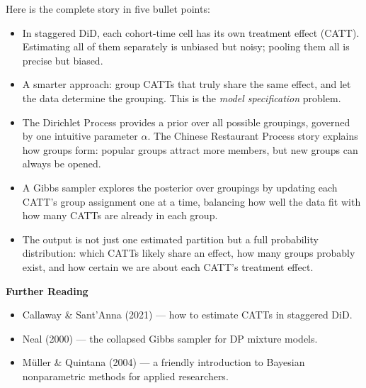 \documentclass[12pt]{article}
\begin{document}
Here is the complete story in five bullet points:

\begin{itemize}

  \item In staggered DiD, each cohort-time cell has its own treatment effect
    (CATT). Estimating all of them separately is unbiased but noisy; pooling
    them all is precise but biased.

  \item A smarter approach: group CATTs that truly share the same effect, and
    let the data determine the grouping. This is the \textit{model specification}
    problem.

  \item The Dirichlet Process provides a prior over all possible groupings,
    governed by one intuitive parameter $\alpha$. The Chinese Restaurant Process
    story explains how groups form: popular groups attract more members, but new
    groups can always be opened.

  \item A Gibbs sampler explores the posterior over groupings by updating each
    CATT's group assignment one at a time, balancing how well the data fit with
    how many CATTs are already in each group.

  \item The output is not just one estimated partition but a full probability
    distribution: which CATTs likely share an effect, how many groups probably
    exist, and how certain we are about each CATT's treatment effect.

\end{itemize}

\bigskip
\noindent\textbf{Further Reading}
\begin{itemize}[nosep]
  \item Callaway \& Sant'Anna (2021) --- how to estimate CATTs in staggered DiD.
  \item Neal (2000) --- the collapsed Gibbs sampler for DP mixture models.
  \item M\"{u}ller \& Quintana (2004) --- a friendly introduction to Bayesian
    nonparametric methods for applied researchers.
\end{itemize}
\end{document}

